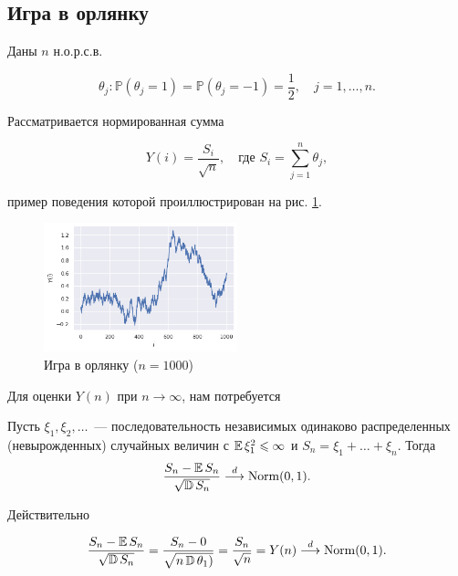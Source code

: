     \subsection{Игра в орлянку}
        Даны $n$ н.о.р.с.в.

        \[\theta_j: \mathbb{P}(\theta_j = 1 ) = \mathbb{P}(\theta_j = -1) 
                                          = \frac{1}{2}, \quad j = 1,\ldots,n.\]

        Рассматривается нормированная сумма

        \[Y(i) = \frac{S_i}{\sqrt{n}},\quad \text{где } 
                                       S_i = \sum\limits_{j = 1}^{n} \theta_j,\]

        пример поведения которой проиллюстрирован на рис. \ref{task1_toss}.

        \bigskip

        \begin{figure}[tbp]
            \centering
            \includegraphics[width=0.5\textwidth]{resources/task1_toss.png}
            \caption{Игра в орлянку ($n = 1000$)}
            \label{task1_toss}
        \end{figure}

        Для оценки $Y(n)$ при $n \rightarrow \infty$, нам потребуется
        \begin{theorem}
            Пусть $\xi_1, \xi_2, \ldots$~--- последовательность независимых 
            одинаково распределенных (невырожденных) случайных величин с 
            $\operatorname{\mathbb{E}}{\xi_1^2} \leqslant \infty$ и $S_n = \xi_1 + \ldots + \xi_n$. Тогда
            \[\frac{S_n - \operatorname{\mathbb{E}}{S_n}}{\sqrt{\operatorname{\mathbb{D}}{S_n}}} 
            \stackrel{d}{\longrightarrow} \mathrm{Norm}(0,1).\]   
        \end{theorem}

        Действительно

        \[\frac{S_n - \operatorname{\mathbb{E}}{S_n}}{\sqrt{\operatorname{\mathbb{D}}{S_n}}} = 
        \frac{S_n - 0}{\sqrt{n\operatorname{\mathbb{D}}{\theta_1)}}} = \frac{S_n}{\sqrt{n}} = Y(n) 
        \stackrel{d}{\longrightarrow} \mathrm{Norm}(0,1).\]
        